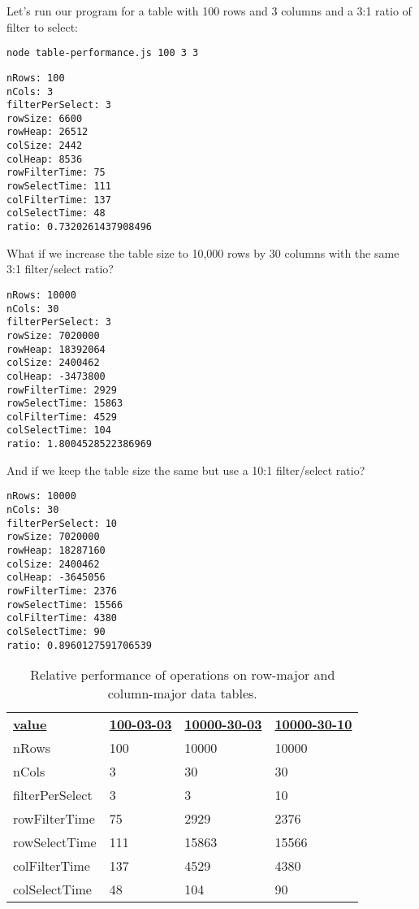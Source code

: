 \documentclass[krantzl]{krantz}
\begin{document}
Let’s run our program for a table with 100 rows and 3 columns and a 3:1 ratio of filter to select:


\begin{lstlisting}[frame=shadowbox]
node table-performance.js 100 3 3
\end{lstlisting}



\begin{lstlisting}[frame=tblr,backgroundcolor=\color{black!5}]
nRows: 100
nCols: 3
filterPerSelect: 3
rowSize: 6600
rowHeap: 26512
colSize: 2442
colHeap: 8536
rowFilterTime: 75
rowSelectTime: 111
colFilterTime: 137
colSelectTime: 48
ratio: 0.7320261437908496
\end{lstlisting}



\noindent What if we increase the table size to 10,000 rows by 30 columns with the same 3:1 filter/select ratio?


\begin{lstlisting}[frame=tblr,backgroundcolor=\color{black!5}]
nRows: 10000
nCols: 30
filterPerSelect: 3
rowSize: 7020000
rowHeap: 18392064
colSize: 2400462
colHeap: -3473800
rowFilterTime: 2929
rowSelectTime: 15863
colFilterTime: 4529
colSelectTime: 104
ratio: 1.8004528522386969
\end{lstlisting}



\noindent And if we keep the table size the same but use a 10:1 filter/select ratio?


\begin{lstlisting}[frame=tblr,backgroundcolor=\color{black!5}]
nRows: 10000
nCols: 30
filterPerSelect: 10
rowSize: 7020000
rowHeap: 18287160
colSize: 2400462
colHeap: -3645056
rowFilterTime: 2376
rowSelectTime: 15566
colFilterTime: 4380
colSelectTime: 90
ratio: 0.8960127591706539
\end{lstlisting}


\begin{table}
\begin{tabular}{llll}
\textbf{\underline{value}} & \textbf{\underline{100-03-03}} & \textbf{\underline{10000-30-03}} & \textbf{\underline{10000-30-10}} \\
nRows & 100 & 10000 & 10000 \\
nCols & 3 & 30 & 30 \\
filterPerSelect & 3 & 3 & 10 \\
rowFilterTime & 75 & 2929 & 2376 \\
rowSelectTime & 111 & 15863 & 15566 \\
colFilterTime & 137 & 4529 & 4380 \\
colSelectTime & 48 & 104 & 90 \\
\end{tabular}
\caption{Relative performance of operations on row-major and column-major data tables.}
\label{data-table-performance}
\end{table}
\end{document}
